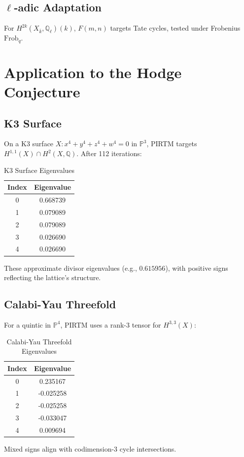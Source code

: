 \documentclass[11pt]{article}
\theoremstyle{plain}
\begin{document}
\subsection{\(\ell\)-adic Adaptation}
For \(H^{2k}(X_{\overline{k}}, \mathbb{Q}_\ell)(k)\), \(F(m,n)\) targets Tate cycles, tested under Frobenius \(\text{Frob}_q\).

\section{Application to the Hodge Conjecture}

\subsection{K3 Surface}
On a K3 surface \(X: x^4 + y^4 + z^4 + w^4 = 0\) in \(\mathbb{P}^3\), PIRTM targets \(H^{1,1}(X) \cap H^2(X, \mathbb{Q})\). After 112 iterations:
\begin{table}[h]
\centering
\begin{tabular}{cc}
\toprule
Index & Eigenvalue \\
\midrule
0 & 0.668739 \\
1 & 0.079089 \\
2 & 0.079089 \\
3 & 0.026690 \\
4 & 0.026690 \\
\bottomrule
\end{tabular}
\caption{K3 Surface Eigenvalues}
\end{table}
These approximate divisor eigenvalues (e.g., \(0.615956\)), with positive signs reflecting the lattice’s structure.

\subsection{Calabi-Yau Threefold}
For a quintic in \(\mathbb{P}^4\), PIRTM uses a rank-3 tensor for \(H^{3,3}(X)\):
\begin{table}[h]
\centering
\begin{tabular}{cc}
\toprule
Index & Eigenvalue \\
\midrule
0 & 0.235167 \\
1 & -0.025258 \\
2 & -0.025258 \\
3 & -0.033047 \\
4 & 0.009694 \\
\bottomrule
\end{tabular}
\caption{Calabi-Yau Threefold Eigenvalues}
\end{table}
Mixed signs align with codimension-3 cycle intersections.
\end{document}
